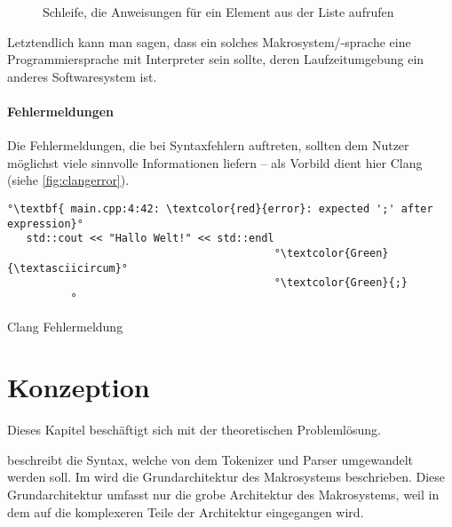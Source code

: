     \begin{figure}[H]
      \centering
      \caption{Schleife, die Anweisungen für ein Element aus der Liste aufrufen}
      \label{fig:loop}
    \end{figure}

    Letztendlich kann man sagen, dass ein solches Makrosystem/-sprache eine Programmiersprache mit Interpreter \autocite[S.274]{Gamma:1995:DPE:186897} sein sollte, deren Laufzeitumgebung ein anderes Softwaresystem ist.

    \paragraph{Fehlermeldungen}
      Die Fehlermeldungen, die bei Syntaxfehlern auftreten, sollten dem Nutzer möglichst viele sinnvolle Informationen liefern -- als Vorbild dient hier Clang (siehe \autoref{fig:clangerror}).

      \begin{myCodeEnv}
        \centering
        \begin{myInvBox}[width=.9\linewidth]
          \begin{lstlisting}[keepspaces,escapechar=°,numbers=none]
°\textbf{ main.cpp:4:42: \textcolor{red}{error}: expected ';' after expression}°
   std::cout << "Hallo Welt!" << std::endl
                                          °\textcolor{Green}{\textasciicircum}°
                                          °\textcolor{Green}{;}
          °\end{lstlisting}
        \end{myInvBox}
        \caption{Clang Fehlermeldung}
        \label{fig:clangerror}
      \end{myCodeEnv}

\section{Konzeption}
\label{sec:Konzeption}
  Dieses Kapitel beschäftigt sich mit der theoretischen Problemlösung.

   beschreibt die Syntax, welche von dem Tokenizer und Parser umgewandelt werden soll. Im  wird die Grundarchitektur des Makrosystems beschrieben. Diese Grundarchitektur umfasst nur die grobe Architektur des Makrosystems, weil in dem  auf die komplexeren Teile der Architektur eingegangen wird.

